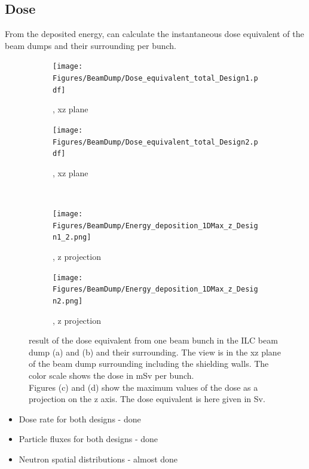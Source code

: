 \subsection{Dose}
\label{BeamDumps:sim_surrounding:Dose} 
From the deposited energy, \fluka can calculate the instantaneous dose equivalent of the beam dumps and their surrounding per bunch.
\begin{figure}[h]
 \centering
  \begin{subfigure}[b]{0.49\textwidth}
   \centering
    \texttt{[image: Figures/BeamDump/Dose\_equivalent\_total\_Design1.pdf]}
   \caption{\designone, xz plane}
   \end{subfigure}
   \hfill
    \begin{subfigure}[b]{0.49\textwidth}
   \centering
    \texttt{[image: Figures/BeamDump/Dose\_equivalent\_total\_Design2.pdf]}
   \caption{\designtwo, xz plane}
   \end{subfigure}\\ \vspace*{0.3cm}
     \begin{subfigure}[b]{0.485\textwidth}
   \centering
    \texttt{[image: Figures/BeamDump/Energy\_deposition\_1DMax\_z\_Design1\_2.png]}
   \caption{\designone, z projection}
   \end{subfigure}
   \hfill
    \begin{subfigure}[b]{0.485\textwidth}
   \centering
    \texttt{[image: Figures/BeamDump/Energy\_deposition\_1DMax\_z\_Design2.png]}
   \caption{\designtwo, z projection}
   \end{subfigure}
   \caption[Dose equivalent in the ILC main beam dump]{\fluka result of the dose equivalent from one beam bunch in the ILC beam dump \designone (a) and \designtwo (b) and their surrounding.
   The view is in the xz plane of the beam dump surrounding including the shielding walls.
   The color scale shows the dose in \si{\milli\sievert} per bunch.
   \\Figures (c) and (d) show the maximum values of the dose as a projection on the z axis.
   The dose equivalent is here given in \si{\sievert}.}
   \label{fig:BeamDumps:Dose}
\end{figure}
 
\begin{itemize}
 \item Dose rate for both designs - done 
 \item Particle fluxes for both designs - done 
 \item Neutron spatial distributions - almost done
\end{itemize}


